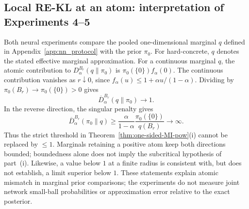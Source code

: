 \documentclass[11pt,a4paper]{article}
\theoremstyle{compactplain}
\theoremstyle{compactdefinition}
\numberwithin{equation}{section}
\begin{document}
\FloatBarrier

\subsection{Local RE-KL at an atom: interpretation of Experiments 4--5}
\label{app:nn_atom_interpretation}

Both neural experiments compare the pooled one-dimensional marginal
\(q\) defined in Appendix~\ref{app:nn_protocol} with the prior \(\pi_0\).
For hard-concrete, \(q\) denotes the stated effective marginal approximation.
For a continuous marginal \(q\), the
atomic contribution to \(D_\alpha^{B_r}(q\|\pi_0)\) is
\(\pi_0(\{0\})f_\alpha(0)\). The continuous contribution vanishes as
\(r\downarrow0\), since
\(f_\alpha(u)\le1+\alpha u/(1-\alpha)\). Dividing by
\(\pi_0(B_r)\to\pi_0(\{0\})>0\) gives
\[
\overline D_\alpha^{B_r}(q\|\pi_0)\to1.
\]
In the reverse direction, the singular penalty gives
\[
\overline D_\alpha^{B_r}(\pi_0\|q)
\ge \frac{\alpha}{1-\alpha}
\frac{\pi_0(\{0\})}{q(B_r)}
\longrightarrow\infty.
\]
Thus the strict threshold in
Theorem~\ref{thm:one-sided-MI-pow}(i) cannot be replaced by \(\le1\).
Marginals retaining a positive atom keep both directions bounded;
boundedness alone does not imply the subcritical hypothesis of part~(i).
Likewise, a value below \(1\) at a finite radius is consistent with,
but does not establish, a limit superior below \(1\).
These statements explain atomic mismatch in marginal prior comparisons;
the experiments do not measure joint network small-ball probabilities
or approximation error relative to the exact posterior.

\FloatBarrier
\end{document}

